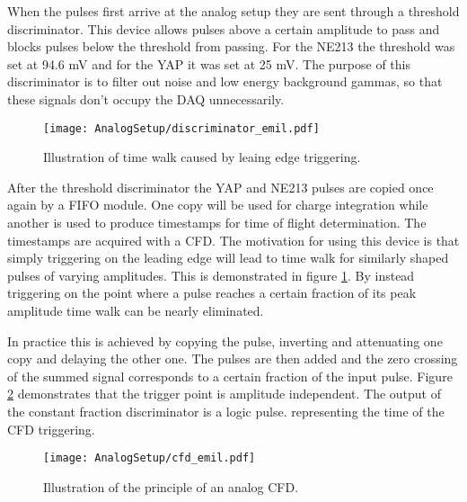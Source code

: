 \documentclass[main.tex]{subfiles}
\begin{document}
When the pulses first arrive at the analog setup they are sent through a threshold discriminator. This device allows pulses above a certain amplitude to pass and blocks pulses below the threshold from passing. For the NE213 the threshold was set at 94.6 mV and for the YAP it was set at 25 mV. The purpose of this discriminator is to filter out noise and low energy background gammas, so that these signals don't occupy the DAQ unnecessarily.
\begin{figure}[h]
    \centering
        \texttt{[image: AnalogSetup/discriminator\_emil.pdf]}
        \caption[Threshold discriminators and time walk]{Illustration of time walk caused by leaing edge triggering\cite{rofors}.}
    \label{fig:discriminator}
\end{figure}
After the threshold discriminator the YAP and NE213 pulses are copied once again by a FIFO module. One copy will be used for charge integration while another is used to produce timestamps for time of flight determination. The timestamps are acquired with a CFD. The motivation for using this device is that simply triggering on the leading edge will lead to time walk for similarly shaped pulses of varying amplitudes. This is demonstrated in figure \ref{fig:discriminator}. By instead triggering on the point where a pulse reaches a certain fraction of its peak amplitude time walk can be nearly eliminated\citep[pg.327]{Leo}.

In practice this is achieved by copying the pulse, inverting and attenuating one copy and delaying the other one. The pulses are then added and the zero crossing of the summed signal corresponds to a certain fraction of the input pulse. Figure \ref{fig:cfd} demonstrates that the trigger point is amplitude independent. The output of the constant fraction discriminator is a logic pulse. representing the time of the CFD triggering.


\begin{figure}[h]
    \centering
        \texttt{[image: AnalogSetup/cfd\_emil.pdf]}
        \caption[CFD trigger principle]{Illustration of the principle of an analog CFD\cite{rofors}.}
    \label{fig:cfd}
\end{figure}
\end{document}
